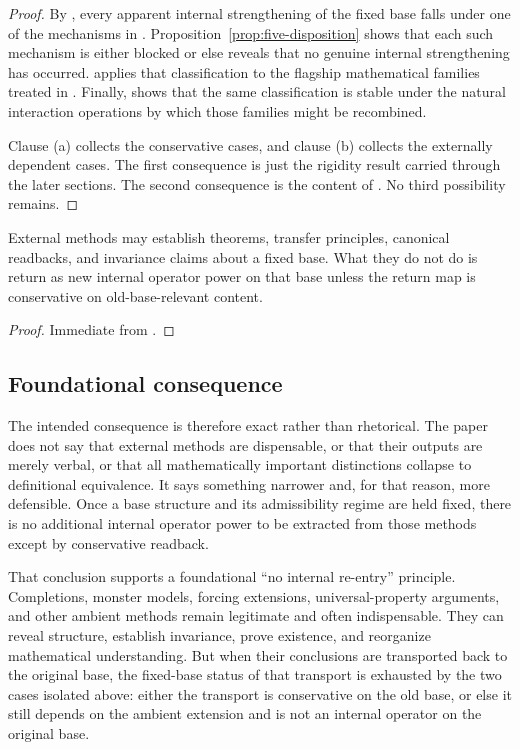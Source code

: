 \begin{proof}
By , every apparent internal strengthening of the fixed base falls under one of the mechanisms in . Proposition~\ref{prop:five-disposition} shows that each such mechanism is either blocked or else reveals that no genuine internal strengthening has occurred.  applies that classification to the flagship mathematical families treated in . Finally,  shows that the same classification is stable under the natural interaction operations by which those families might be recombined.

Clause (a) collects the conservative cases, and clause (b) collects the externally dependent cases. The first consequence is just the rigidity result  carried through the later sections. The second consequence is the content of . No third possibility remains.
\end{proof}

\begin{corollary}\label{cor:no-internal-reentry-principle}
External methods may establish theorems, transfer principles, canonical readbacks, and invariance claims about a fixed base. What they do not do is return as new internal operator power on that base unless the return map is conservative on old-base-relevant content.
\end{corollary}

\begin{proof}
Immediate from .
\end{proof}

\subsection*{Foundational consequence}

The intended consequence is therefore exact rather than rhetorical. The paper does not say that external methods are dispensable, or that their outputs are merely verbal, or that all mathematically important distinctions collapse to definitional equivalence. It says something narrower and, for that reason, more defensible. Once a base structure and its admissibility regime are held fixed, there is no additional internal operator power to be extracted from those methods except by conservative readback.

That conclusion supports a foundational ``no internal re-entry'' principle. Completions, monster models, forcing extensions, universal-property arguments, and other ambient methods remain legitimate and often indispensable. They can reveal structure, establish invariance, prove existence, and reorganize mathematical understanding. But when their conclusions are transported back to the original base, the fixed-base status of that transport is exhausted by the two cases isolated above: either the transport is conservative on the old base, or else it still depends on the ambient extension and is not an internal operator on the original base.
